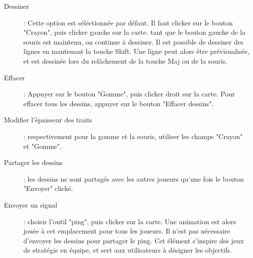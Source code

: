\begin{description}
	\item[Dessiner]: Cette option est séléctionnée par défaut. Il faut clicker sur le bouton "Crayon", puis clicker gauche sur la carte. tant que le bouton gauche de la souris est maintenu, on continue à dessiner. Il est possible de dessiner des lignes en mantenant la touche Shift. Une ligne peut alors être prévisualisée, et est dessinée lors du relâchement de la touche Maj ou de la souris.
	\item[Effacer]: Appuyer sur le bouton "Gomme", puis clicker droit sur la carte. Pour effacer tous les dessins, appuyer sur le bouton "Effacer dessins".
	\item[Modifier l'épaisseur des traits]: respectivement pour la gomme et la souris, utiliser les champs "Crayon" et "Gomme".
	\item[Partager les dessins]: les dessins ne sont partagés avec les autres joueurs qu'une fois le bouton "Envoyer" clické.
	\item[Envoyer un signal]: choisir l'outil "ping", puis clicker sur la carte. Une animation est alors jouée à cet emplacement pour tous les joueurs. Il n'est pas nécessaire d'envoyer les dessins pour partager le ping. Cet élément s'inspire des jeux de stratégie en équipe, et sert aux utilisateurs à désigner les objectifs.
\end{description}




